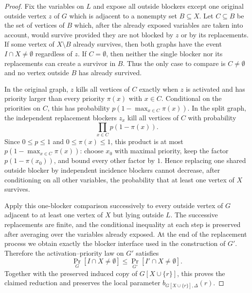 \begin{proof}
Fix the variables on $L$ and expose all outside blockers except one original
outside vertex $z$ of $G$ which is adjacent to a nonempty set
$B\subseteq X$.  Let $C\subseteq B$ be the set of vertices of $B$ which,
after the already exposed variables are taken into account, would survive
provided they are not blocked by $z$ or by its replacements.  If some vertex
of $X\setminus B$ already survives, then both graphs have the event
$I\cap X\ne\emptyset$ regardless of $z$.  If $C=\emptyset$, then neither the
single blocker nor its replacements can create a survivor in $B$.  Thus the
only case to compare is $C\ne\emptyset$ and no vertex outside $B$ has already
survived.

In the original graph, $z$ kills all vertices of $C$ exactly when $z$ is
activated and has priority larger than every priority $\pi(x)$ with
$x\in C$.  Conditional on the priorities on $C$, this has probability
$p(1-\max_{x\in C}\pi(x))$.  In the split graph, the independent replacement
blockers $z_x$ kill all vertices of $C$ with probability
\[
\prod_{x\in C} p(1-\pi(x)).
\]
Since $0\le p\le 1$ and $0\le\pi(x)\le 1$, this product is at most
$p(1-\max_{x\in C}\pi(x))$: choose $x_0$ with maximal priority, keep the
factor $p(1-\pi(x_0))$, and bound every other factor by $1$.  Hence replacing
one shared outside blocker by independent incidence blockers cannot decrease,
after conditioning on all other variables, the probability that at least one
vertex of $X$ survives.

Apply this one-blocker comparison successively to every outside vertex of
$G$ adjacent to at least one vertex of $X$ but lying outside $L$.  The
successive replacements are finite, and the conditional inequality at each
step is preserved after averaging over the variables already exposed.  At
the end of the replacement process we obtain exactly the blocker interface
used in the construction of $G'$.  Therefore the activation--priority law on
$G'$ satisfies
\[
\Pr_G[I\cap X\ne\emptyset]\le
\Pr_{G'}[I'\cap X\ne\emptyset].
\]
Together with the preserved induced copy of $G[X\cup\{r\}]$, this proves the
claimed reduction and preserves the local parameter
$b_{G[X\cup\{r\}],\Delta}(r)$.
\end{proof}
